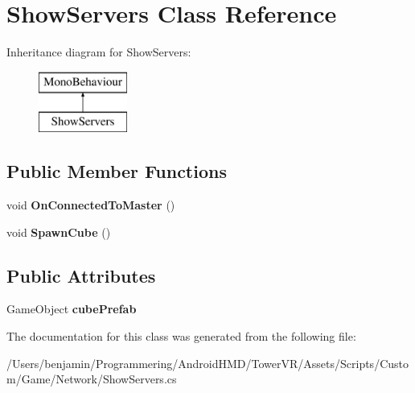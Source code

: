 \hypertarget{class_show_servers}{}\section{Show\+Servers Class Reference}
\label{class_show_servers}
Inheritance diagram for Show\+Servers\+:\begin{figure}[H]
\begin{center}
\leavevmode
\includegraphics[height=2.000000cm]{class_show_servers}
\end{center}
\end{figure}
\subsection*{Public Member Functions}
\begin{DoxyCompactItemize}
\item 
void {\bfseries On\+Connected\+To\+Master} ()\hypertarget{class_show_servers_a42a7450772bbf1ae31bf576dcf6322d3}{}\label{class_show_servers_a42a7450772bbf1ae31bf576dcf6322d3}

\item 
void {\bfseries Spawn\+Cube} ()\hypertarget{class_show_servers_a69fabbb10d9ea266b32d767a0905ed25}{}\label{class_show_servers_a69fabbb10d9ea266b32d767a0905ed25}

\end{DoxyCompactItemize}
\subsection*{Public Attributes}
\begin{DoxyCompactItemize}
\item 
Game\+Object {\bfseries cube\+Prefab}\hypertarget{class_show_servers_ab9d074dfd7020e70dade8682a7ac69bf}{}\label{class_show_servers_ab9d074dfd7020e70dade8682a7ac69bf}

\end{DoxyCompactItemize}


The documentation for this class was generated from the following file\+:\begin{DoxyCompactItemize}
\item 
/\+Users/benjamin/\+Programmering/\+Android\+H\+M\+D/\+Tower\+V\+R/\+Assets/\+Scripts/\+Custom/\+Game/\+Network/Show\+Servers.\+cs\end{DoxyCompactItemize}
